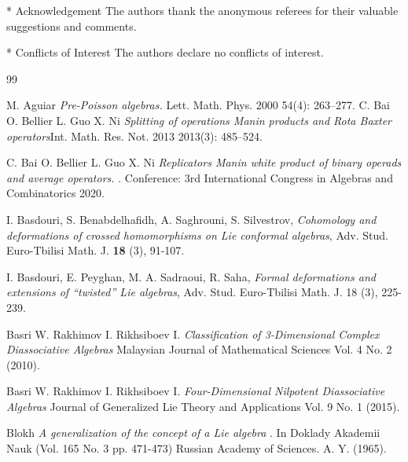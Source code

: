\documentclass[11pt,twoside,reqno]{amsart}
\makeatletter
\renewcommand{\section}{\@startsection{section}{1}
  \z@{.7\linespacing\@plus\linespacing}{.5\linespacing}
  {\normalfont\upshape\bfseries\centering}}
\theoremstyle{plain}
\theoremstyle{definition}
\makeatother
\begin{document}
\section*{ Acknowledgement}
The authors thank the anonymous referees for their valuable suggestions and comments. 

\section*{ Conflicts of Interest}
The authors declare no conflicts of interest.
\begin{thebibliography}{99}

 M. Aguiar {\it  Pre-Poisson algebras.}  Lett. Math. Phys.  2000  54(4): 263–277.
 C. Bai  O. Bellier  L. Guo  X. Ni {\it Splitting of operations  Manin products and Rota Baxter operators}Int. Math. Res. Not.  2013  2013(3): 485–524.

 C. Bai  O. Bellier  L. Guo  X. Ni {\it  Replicators  Manin white product of binary operads and average operators. }. Conference: 3rd International Congress in Algebras and
 Combinatorics  2020.

I. Basdouri, S. Benabdelhafidh, A. Saghrouni, S. Silvestrov, \textit{Cohomology and deformations of crossed homomorphisms on Lie conformal algebras}, Adv. Stud. Euro-Tbilisi Math. J. \textbf{18} (3), 91-107.

I. Basdouri, E. Peyghan, M. A. Sadraoui, R. Saha, \textit{Formal deformations and extensions of “twisted” Lie algebras}, Adv. Stud. Euro-Tbilisi Math. J. 18 (3), 225-239.


 Basri W.  Rakhimov I.  Rikhsiboev I. {\it Classification of 3-Dimensional Complex Diassociative Algebras}  Malaysian Journal of Mathematical Sciences  Vol. 4  No. 2 (2010).


 Basri W.  Rakhimov I.  Rikhsiboev I. {\it Four-Dimensional Nilpotent Diassociative Algebras} Journal of Generalized Lie Theory and Applications  Vol. 9  No. 1 (2015).


 Blokh  {\it A generalization of the concept of a Lie algebra} . In Doklady Akademii Nauk (Vol. 165  No. 3  pp. 471-473) Russian Academy of Sciences. A. Y. (1965).


\end{thebibliography}
\end{document}
